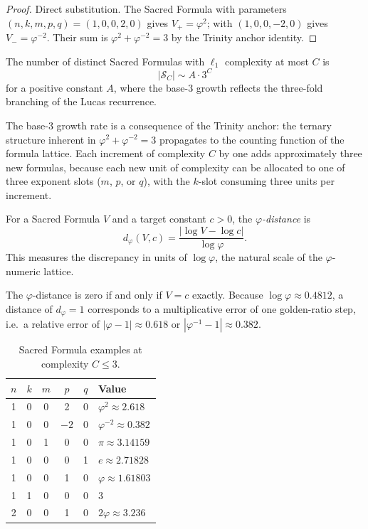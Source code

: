 \begin{proof}
Direct substitution. The Sacred Formula with parameters $(n,k,m,p,q) =
(1,0,0,2,0)$ gives $V_{+} = \varphi^{2}$; with $(1,0,0,-2,0)$
gives $V_{-} = \varphi^{-2}$. Their sum is
$\varphi^{2} + \varphi^{-2} = 3$ by the Trinity anchor identity.
\end{proof}

\begin{proposition}
\label{fa_04:prop:shell}
The number of distinct Sacred Formulas with $\ell_{1}$ complexity at
most $C$ is
\[
  |\mathcal{S}_{C}| \sim A \cdot 3^{C}
\]
for a positive constant $A$, where the base-$3$ growth reflects the
three-fold branching of the Lucas recurrence.
\end{proposition}

The base-$3$ growth rate is a consequence of the Trinity anchor:
the ternary structure inherent in $\varphi^{2} + \varphi^{-2} = 3$
propagates to the counting function of the formula lattice. Each
increment of complexity $C$ by one adds approximately three new
formulas, because each new unit of complexity can be allocated to one
of three exponent slots ($m$, $p$, or $q$), with the $k$-slot
consuming three units per increment.

\begin{definition}
\label{fa_04:def:phi-distance-sf}
For a Sacred Formula $V$ and a target constant $c > 0$, the
\emph{$\varphi$-distance} is
\[
  d_{\varphi}(V, c) = \frac{|\log V - \log c|}{\log \varphi}.
\]
This measures the discrepancy in units of $\log \varphi$, the natural
scale of the $\varphi$-numeric lattice.
\end{definition}

The $\varphi$-distance is zero if and only if $V = c$ exactly.
Because $\log \varphi \approx 0.4812$, a distance of $d_{\varphi} =
1$ corresponds to a multiplicative error of one golden-ratio step,
i.e.\ a relative error of $|\varphi - 1| \approx 0.618$ or
$|\varphi^{-1} - 1| \approx 0.382$.

\begin{table}[h]
\centering
\caption{Sacred Formula examples at complexity $C \le 3$.}
\label{fa_04:tab:sacred-examples}
\begin{tabular}{@{}cccccl@{}}
\toprule
$n$ & $k$ & $m$ & $p$ & $q$ & Value \\
\midrule
1 & 0 & 0 & 2 & 0 & $\varphi^{2} \approx 2.618$ \\
1 & 0 & 0 & $-2$ & 0 & $\varphi^{-2} \approx 0.382$ \\
1 & 0 & 1 & 0 & 0 & $\pi \approx 3.14159$ \\
1 & 0 & 0 & 0 & 1 & $e \approx 2.71828$ \\
1 & 0 & 0 & 1 & 0 & $\varphi \approx 1.61803$ \\
1 & 1 & 0 & 0 & 0 & $3$ \\
2 & 0 & 0 & 1 & 0 & $2\varphi \approx 3.236$ \\
\bottomrule
\end{tabular}
\end{table}

